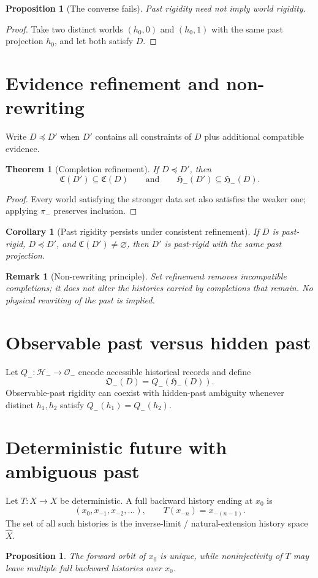 \documentclass[11pt]{article}
\newtheorem{proposition}[definition]{Proposition}
\newtheorem{theorem}[definition]{Theorem}
\newtheorem{corollary}[definition]{Corollary}
\newtheorem{remark}[definition]{Remark}
\newcommand{\Ccal}{\mathfrak C}
\newcommand{\Hminus}{\mathcal H_-}
\newcommand{\Pcal}{\mathfrak H_-}
\begin{document}
\begin{proposition}[The converse fails]
Past rigidity need not imply world rigidity.
\end{proposition}
\begin{proof}
Take two distinct worlds $(h_0,0)$ and $(h_0,1)$ with the same past projection $h_0$, and let both satisfy $D$.
\end{proof}

\section{Evidence refinement and non-rewriting}
Write $D\preceq D'$ when $D'$ contains all constraints of $D$ plus additional compatible evidence.
\begin{theorem}[Completion refinement]
If $D\preceq D'$, then
\[
\Ccal(D')\subseteq\Ccal(D)
\qquad\text{and}\qquad
\Pcal(D')\subseteq\Pcal(D).
\]
\end{theorem}
\begin{proof}
Every world satisfying the stronger data set also satisfies the weaker one; applying $\pi_-$ preserves inclusion.
\end{proof}
\begin{corollary}[Past rigidity persists under consistent refinement]
If $D$ is past-rigid, $D\preceq D'$, and $\Ccal(D')\neq\varnothing$, then $D'$ is past-rigid with the same past projection.
\end{corollary}
\begin{remark}[Non-rewriting principle]
Set refinement removes incompatible completions; it does not alter the histories carried by completions that remain. No physical rewriting of the past is implied.
\end{remark}

\section{Observable past versus hidden past}
Let $Q_-:\Hminus\to\mathcal O_-$ encode accessible historical records and define
\[
\mathfrak O_-(D)=Q_-(\Pcal(D)).
\]
Observable-past rigidity can coexist with hidden-past ambiguity whenever distinct $h_1,h_2$ satisfy $Q_-(h_1)=Q_-(h_2)$.

\section{Deterministic future with ambiguous past}
Let $T:X\to X$ be deterministic. A full backward history ending at $x_0$ is
\[
(x_0,x_{-1},x_{-2},\ldots),
\qquad T(x_{-n})=x_{-(n-1)}.
\]
The set of all such histories is the inverse-limit / natural-extension history space $\widehat X$.
\begin{proposition}
The forward orbit of $x_0$ is unique, while noninjectivity of $T$ may leave multiple full backward histories over $x_0$.
\end{proposition}
\end{document}
